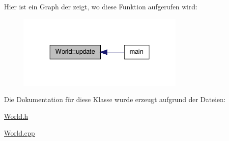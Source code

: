 Hier ist ein Graph der zeigt, wo diese Funktion aufgerufen wird\-:
\nopagebreak
\begin{figure}[H]
\begin{center}
\leavevmode
\includegraphics[width=232pt]{class_world_aac8c1fde63c06577ffc648aaefdb37f0_icgraph}
\end{center}
\end{figure}




Die Dokumentation für diese Klasse wurde erzeugt aufgrund der Dateien\-:\begin{DoxyCompactItemize}
\item 
\hyperlink{_world_8h}{World.\-h}\item 
\hyperlink{_world_8cpp}{World.\-cpp}\end{DoxyCompactItemize}
